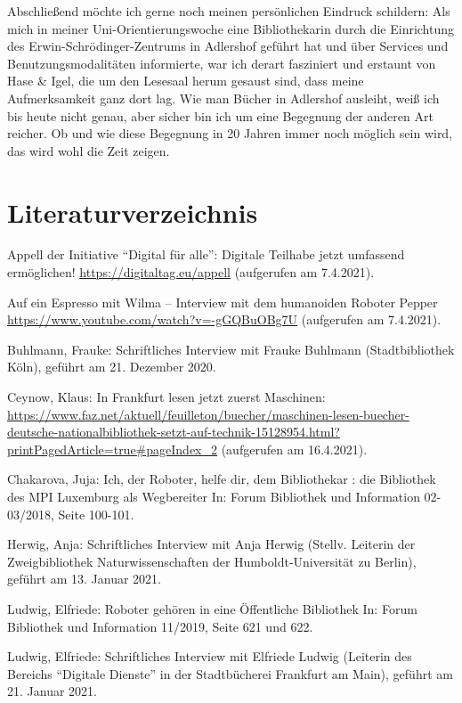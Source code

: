 \documentclass[a4paper,
fontsize=11pt,
oneside,
numbers=noperiodatend,
parskip=half-,
bibliography=totoc,
final
]{scrartcl}
\begin{document}
Abschließend möchte ich gerne noch meinen persönlichen Eindruck
schildern: Als mich in meiner Uni-Orientierungswoche eine Bibliothekarin
durch die Einrichtung des Erwin-Schrödinger-Zentrums in Adlershof
geführt hat und über Services und Benutzungsmodalitäten informierte, war
ich derart fasziniert und erstaunt von Hase \& Igel, die um den Lesesaal
herum gesaust sind, dass meine Aufmerksamkeit ganz dort lag. Wie man
Bücher in Adlershof ausleiht, weiß ich bis heute nicht genau, aber
sicher bin ich um eine Begegnung der anderen Art reicher. Ob und wie
diese Begegnung in 20 Jahren immer noch möglich sein wird, das wird wohl
die Zeit zeigen.

\hypertarget{literaturverzeichnis}{%
\section{Literaturverzeichnis}\label{literaturverzeichnis}}

Appell der Initiative \enquote{Digital für alle}: Digitale Teilhabe
jetzt umfassend ermöglichen! \url{https://digitaltag.eu/appell}
(aufgerufen am 7.4.2021).

Auf ein Espresso mit Wilma -- Interview mit dem humanoiden Roboter
Pepper \url{https://www.youtube.com/watch?v=-gGQBuOBg7U} (aufgerufen am
7.4.2021).

Buhlmann, Frauke: Schriftliches Interview mit Frauke Buhlmann
(Stadtbibliothek Köln), geführt am 21. Dezember 2020.

Ceynow, Klaus: In Frankfurt lesen jetzt zuerst Maschinen:
\url{https://www.faz.net/aktuell/feuilleton/buecher/maschinen-lesen-buecher-deutsche-nationalbibliothek-setzt-auf-technik-15128954.html?printPagedArticle=true\#pageIndex_2}
(aufgerufen am 16.4.2021).

Chakarova, Juja: Ich, der Roboter, helfe dir, dem Bibliothekar : die
Bibliothek des MPI Luxemburg als Wegbereiter In: Forum Bibliothek und
Information 02-03/2018, Seite 100-101.

Herwig, Anja: Schriftliches Interview mit Anja Herwig (Stellv. Leiterin
der Zweigbibliothek Naturwissenschaften der Humboldt-Universität zu
Berlin), geführt am 13. Januar 2021.

Ludwig, Elfriede: Roboter gehören in eine Öffentliche Bibliothek In:
Forum Bibliothek und Information 11/2019, Seite 621 und 622.

Ludwig, Elfriede: Schriftliches Interview mit Elfriede Ludwig (Leiterin
des Bereichs \enquote{Digitale Dienste} in der Stadtbücherei Frankfurt am Main),
geführt am 21. Januar 2021.
\end{document}
